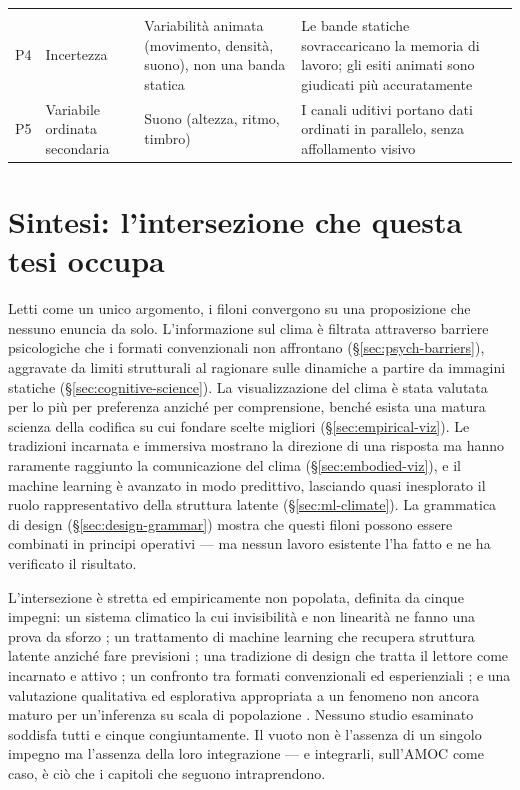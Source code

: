 \begin{table}[!ht]
\begin{tabular}{@{}p{0.5cm}p{2.5cm}p{2.9cm}p{3.3cm}p{2.3cm}@{}}
           & \citet{bertin1983, ware2021} \\[0.4em]
        P4 & Incertezza
           & Variabilità animata (movimento, densità, suono), non una banda statica
           & Le bande statiche sovraccaricano la memoria di lavoro; gli esiti animati sono giudicati più accuratamente
           & \citet{padilla2018, hullman2015hops, kale2019hops} \\[0.4em]
        P5 & Variabile ordinata secondaria
           & Suono (altezza, ritmo, timbro)
           & I canali uditivi portano dati ordinati in parallelo, senza affollamento visivo
           & \citet{hermann2011} \\
        \bottomrule
    \end{tabular}
\end{table}

\section{Sintesi: l'intersezione che questa tesi occupa}
\label{sec:literature-synthesis}

Letti come un unico argomento, i filoni convergono su una proposizione che nessuno enuncia da solo. L'informazione sul clima è filtrata attraverso barriere psicologiche che i formati convenzionali non affrontano (\S\ref{sec:psych-barriers}), aggravate da limiti strutturali al ragionare sulle dinamiche a partire da immagini statiche (\S\ref{sec:cognitive-science}). La visualizzazione del clima è stata valutata per lo più per preferenza anziché per comprensione, benché esista una matura scienza della codifica su cui fondare scelte migliori (\S\ref{sec:empirical-viz}). Le tradizioni incarnata e immersiva mostrano la direzione di una risposta ma hanno raramente raggiunto la comunicazione del clima (\S\ref{sec:embodied-viz}), e il machine learning è avanzato in modo predittivo, lasciando quasi inesplorato il ruolo rappresentativo della struttura latente (\S\ref{sec:ml-climate}). La grammatica di design (\S\ref{sec:design-grammar}) mostra che questi filoni possono essere combinati in principi operativi --- ma nessun lavoro esistente l'ha fatto e ne ha verificato il risultato.

L'intersezione è stretta ed empiricamente non popolata, definita da cinque impegni: un sistema climatico la cui invisibilità e non linearità ne fanno una prova da sforzo \citep{lenton2008, armstrongmckay2022}; un trattamento di machine learning che recupera struttura latente anziché fare previsioni \citep{sonnewald2019, iten2020}; una tradizione di design che tratta il lettore come incarnato e attivo \citep{lakoff1999, jansen2015, marriott2018}; un confronto tra formati convenzionali ed esperienziali \parencite{harold2016, hegarty2012}; e una valutazione qualitativa ed esplorativa appropriata a un fenomeno non ancora maturo per un'inferenza su scala di popolazione \citep{braunclarke2006}. Nessuno studio esaminato soddisfa tutti e cinque congiuntamente. Il vuoto non è l'assenza di un singolo impegno ma l'assenza della loro integrazione --- e integrarli, sull'AMOC come caso, è ciò che i capitoli che seguono intraprendono.
